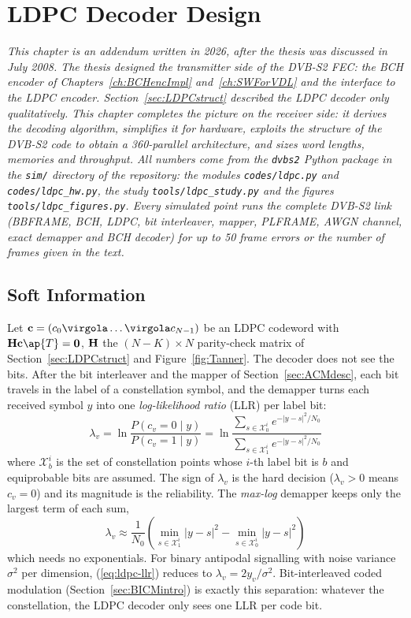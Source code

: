 \chapter{LDPC Decoder Design} \label{ch:LDPCdec}

\emph{This chapter is an addendum written in 2026, after the thesis was discussed in July 2008. The thesis designed the transmitter side of the DVB-S2 FEC: the BCH encoder of Chapters~\ref{ch:BCHencImpl} and~\ref{ch:SWForVDL} and the interface to the LDPC encoder. Section~\ref{sec:LDPCstruct} described the LDPC decoder only qualitatively. This chapter completes the picture on the receiver side: it derives the decoding algorithm, simplifies it for hardware, exploits the structure of the DVB-S2 code to obtain a 360-parallel architecture, and sizes word lengths, memories and throughput. All numbers come from the \texttt{dvbs2} Python package in the \texttt{sim/} directory of the repository: the modules \texttt{codes/ldpc.py} and \texttt{codes/ldpc\_hw.py}, the study \texttt{tools/ldpc\_study.py} and the figures \texttt{tools/ldpc\_figures.py}. Every simulated point runs the complete DVB-S2 link (BBFRAME, BCH, LDPC, bit interleaver, mapper, PLFRAME, AWGN channel, exact demapper and BCH decoder) for up to 50 frame errors or the number of frames given in the text.}

\section{Soft Information}

Let \(\vet c = (c_0 \virgola \ldots \virgola c_{N-1})\) be an LDPC codeword with \(\vet H \vet c\ap{T} = \vet 0\), \(\mathbf{H}\) the \((N-K) \times N\) parity-check matrix of Section~\ref{sec:LDPCstruct} and Figure~\ref{fig:Tanner}. The decoder does not see the bits. After the bit interleaver and the mapper of Section~\ref{sec:ACMdesc}, each bit travels in the label of a constellation symbol, and the demapper turns each received symbol \(y\) into one \emph{log-likelihood ratio} (LLR) per label bit:
\begin{equation} \label{eq:ldpc-llr}
\lambda_v = \ln \frac{P(c_v = 0 \mid y)}{P(c_v = 1 \mid y)} = \ln \frac{\sum_{s \in \mathcal{X}_0^i} e^{-|y - s|^2 / N_0}}{\sum_{s \in \mathcal{X}_1^i} e^{-|y - s|^2 / N_0}}
\end{equation}
where \(\mathcal{X}_b^i\) is the set of constellation points whose \(i\)-th label bit is \(b\) and equiprobable bits are assumed. The sign of \(\lambda_v\) is the hard decision (\(\lambda_v > 0\) means \(c_v = 0\)) and its magnitude is the reliability. The \emph{max-log} demapper keeps only the largest term of each sum,
\begin{equation} \label{eq:ldpc-maxlog}
\lambda_v \approx \frac{1}{N_0}\left( \min_{s \in \mathcal{X}_1^i} |y-s|^2 - \min_{s \in \mathcal{X}_0^i} |y-s|^2 \right)
\end{equation}
which needs no exponentials. For binary antipodal signalling with noise variance \(\sigma^2\) per dimension, (\ref{eq:ldpc-llr}) reduces to \(\lambda_v = 2 y_v / \sigma^2\). Bit-interleaved coded modulation (Section~\ref{sec:BICMintro}) is exactly this separation: whatever the constellation, the LDPC decoder only sees one LLR per code bit.

